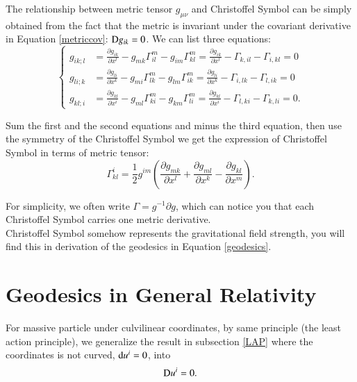\documentclass[openany,10pt]{book}
\theoremstyle{definition}
\theoremstyle{definition}
\theoremstyle{remark}
\begin{document}
The relationship between metric tensor $g_{\mu\nu}$ and Christoffel Symbol can be simply obtained from the fact that the metric is invariant under the covariant derivative in Equation \ref{metriccov}: ${\rm D}g_{ik}=0$. We can list three equations:
\begin{equation}
    \left\{\begin{aligned}
        g_{ik;l}&=\frac{\partial g_{ik}}{\partial x^l}-g_{mk}\Gamma^m_{il}-g_{im}\Gamma^m_{kl}=\frac{\partial g_{ik}}{\partial x^l}-\Gamma_{k,il}-\Gamma_{i,kl}=0\\
        g_{li;k}&=\frac{\partial g_{li}}{\partial x^k}-g_{mi}\Gamma^m_{lk}-g_{lm}\Gamma^m_{ik}=\frac{\partial g_{li}}{\partial x^k}-\Gamma_{i,lk}-\Gamma_{l,ik}=0\\
        g_{kl;i}&=\frac{\partial g_{kl}}{\partial x^i}-g_{ml}\Gamma^m_{ki}-g_{km}\Gamma^m_{li}=\frac{\partial g_{kl}}{\partial x^i}-\Gamma_{l,ki}-\Gamma_{k,li}=0.
    \end{aligned}\right.
\end{equation}
 
Sum the first and the second equations and minus the third equation, then use the symmetry of the Christoffel Symbol we get the expression of Christoffel Symbol in terms of metric tensor:
\begin{equation}
    \Gamma^i_{kl}=\frac12 g^{im}\left(\frac{\partial g_{mk}}{\partial x^l}+\frac{\partial g_{ml}}{\partial x^k}-\frac{\partial g_{kl}}{\partial x^m}\right).
    \label{Ch S}
\end{equation}

For simplicity, we often write $\Gamma=g^{-1}\partial g$, which can notice you that each Christoffel Symbol carries one metric derivative.\\

Christoffel Symbol somehow represents the gravitational field strength, you will find this in derivation of the geodesics in Equation \ref{geodesics}.




\section{Geodesics in General Relativity}
For massive particle under culvilinear coordinates, by same principle (the least action principle), we generalize the result in subsection \ref{LAP} where the coordinates is not curved,  ${\rm d}u^i=0$, into
\begin{equation}
    {\rm D}u^i=0.
\end{equation}
\end{document}
